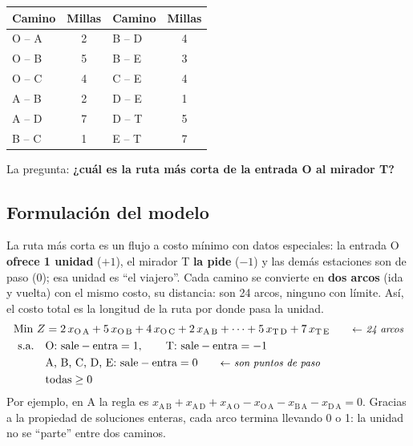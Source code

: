 \documentclass[11pt,a4paper]{article}
\newcommand{\x}[2]{x_{\mathrm{#1}\,\mathrm{#2}}}
\begin{document}
\noindent
\begin{minipage}[c]{0.38\textwidth}\small\centering
\begin{tabular}{lc@{\quad}lc}
\toprule
\textbf{Camino} & \textbf{Millas} & \textbf{Camino} & \textbf{Millas} \\
\midrule
O -- A & 2 & B -- D & 4 \\
O -- B & 5 & B -- E & 3 \\
O -- C & 4 & C -- E & 4 \\
A -- B & 2 & D -- E & 1 \\
A -- D & 7 & D -- T & 5 \\
B -- C & 1 & E -- T & 7 \\
\bottomrule
\end{tabular}
\end{minipage}\hfill
\begin{minipage}[c]{0.60\textwidth}\centering
{}
\end{minipage}

La pregunta: \textbf{¿cuál es la ruta más corta de la entrada O al mirador T?}

\subsection*{Formulación del modelo}
La ruta más corta es un flujo a costo mínimo con datos especiales: la entrada O \textbf{ofrece 1 unidad} ($+1$), el
mirador T \textbf{la pide} ($-1$) y las demás estaciones son de paso (0); esa unidad es ``el viajero''. Cada camino se
convierte en \textbf{dos arcos} (ida y vuelta) con el mismo costo, su distancia: son 24 arcos, ninguno con límite. Así,
el costo total es la longitud de la ruta por donde pasa la unidad.
\[
\begin{aligned}
\text{Min } Z &= 2\,\x{O}{A} + 5\,\x{O}{B} + 4\,\x{O}{C} + 2\,\x{A}{B} + \dots + 5\,\x{T}{D} + 7\,\x{T}{E} \nota{24 arcos}\\
\text{s.a.}\quad & \text{O: sale} - \text{entra} = 1, \qquad \text{T: sale} - \text{entra} = -1\\
& \text{A, B, C, D, E: sale} - \text{entra} = 0 \nota{son puntos de paso}\\
& \text{todas} \ge 0
\end{aligned}
\]
Por ejemplo, en A la regla es $\x{A}{B} + \x{A}{D} + \x{A}{O} - \x{O}{A} - \x{B}{A} - \x{D}{A} = 0$.
Gracias a la propiedad de soluciones enteras, cada arco termina llevando 0 o 1: la unidad no se ``parte'' entre dos caminos.
\end{document}
